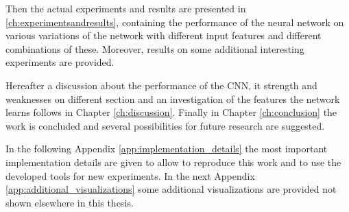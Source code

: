 Then the actual experiments and results are presented in \ref{ch:experimentsandresults}, containing the performance of the neural network on various variations of the network with different input features and different combinations of these. Moreover, results on some additional interesting experiments are provided.

Hereafter a discussion about the performance of the CNN, it strength and weaknesses on different section and an investigation of the features the network learns follows in Chapter \ref{ch:discussion}. Finally in Chapter \ref{ch:conclusion} the work is concluded and several possibilities for future research are suggested. 

In the following Appendix \ref{app:implementation_details} the most important implementation details are given to allow to reproduce this work and to use the developed tools for new experiments. In the next Appendix \ref{app:additional_visualizations} some additional visualizations are provided not shown elsewhere in this thesis.
